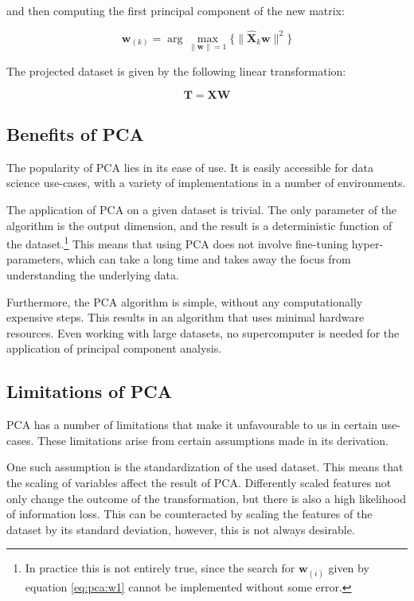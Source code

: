 and then computing the first principal component of the new matrix:

\begin{equation}
	\mathbf{w}_{(k)}=\arg\max_{\lVert \mathbf{w} \rVert = 1}{\Bigg\{ \lVert \mathbf{\hat {X}}_{k}\mathbf{w} \rVert ^2 \Bigg\} }
	\label{eq:pca:wk}
\end{equation}

The projected dataset is given by the following linear transformation:

\begin{equation}
	\mathbf{T} = \mathbf{XW}
	\label{eq:pca:t}
\end{equation}

\subsection{Benefits of PCA}\label{subsec:benefits-of-pca}

The popularity of PCA lies in its ease of use. It is easily accessible for data science use-cases, with a variety of implementations in a number of environments.

The application of PCA on a given dataset is trivial. The only parameter of the algorithm is the output dimension, and the result is a deterministic function of the dataset.\footnote{In practice this is not entirely true, since the search for $\mathbf{w}_{(i)}$ given by equation \eqref{eq:pca:w1} cannot be implemented without some error.} This means that using PCA does not involve fine-tuning hyper-parameters, which can take a long time and takes away the focus from understanding the underlying data.

Furthermore, the PCA algorithm is simple, without any computationally expensive steps. This results in an algorithm that uses minimal hardware resources. Even working with large datasets, no supercomputer is needed for the application of principal component analysis.

\subsection{Limitations of PCA}\label{subsec:limitations-of-pca}


PCA has a number of limitations that make it unfavourable to us in certain use-cases. These limitations arise from certain assumptions made in its derivation.

One such assumption is the standardization of the used dataset. This means that the scaling of variables affect the result of PCA. Differently scaled features not only change the outcome of the transformation, but there is also a high likelihood of information loss. This can be counteracted by scaling the features of the dataset by its standard deviation, however, this is not always desirable.

